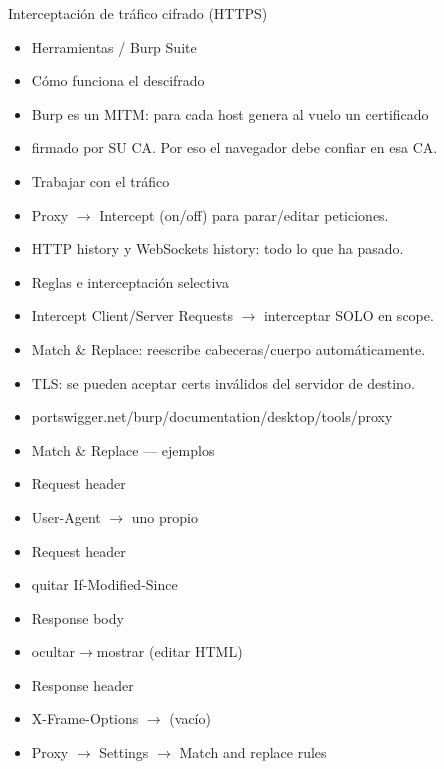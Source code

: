 \documentclass[aspectratio=169,10pt]{beamer}
\begin{document}
\begin{frame}[allowframebreaks]{Interceptación de tráfico cifrado (HTTPS)}
\small
  \begin{itemize}
  \item Herramientas / Burp Suite
  \item Cómo funciona el descifrado
  \item Burp es un MITM: para cada host genera al vuelo un certificado
  \item firmado por SU CA. Por eso el navegador debe confiar en esa CA.
  \item Trabajar con el tráfico
  \item Proxy $\rightarrow$ Intercept (on/off) para parar/editar peticiones.
  \item HTTP history y WebSockets history: todo lo que ha pasado.
  \item Reglas e interceptación selectiva
  \item Intercept Client/Server Requests $\rightarrow$ interceptar SOLO en scope.
  \item Match \& Replace: reescribe cabeceras/cuerpo automáticamente.
  \item TLS: se pueden aceptar certs inválidos del servidor de destino.
  \item portswigger.net/burp/documentation/desktop/tools/proxy
  \item Match \& Replace --- ejemplos
  \item Request header
  \item User-Agent $\rightarrow$ uno propio
  \item Request header
  \item quitar If-Modified-Since
  \item Response body
  \item ocultar$\rightarrow$mostrar (editar HTML)
  \item Response header
  \item X-Frame-Options $\rightarrow$ (vacío)
  \item Proxy $\rightarrow$ Settings $\rightarrow$ Match and replace rules
  \end{itemize}
\end{frame}
\end{document}
